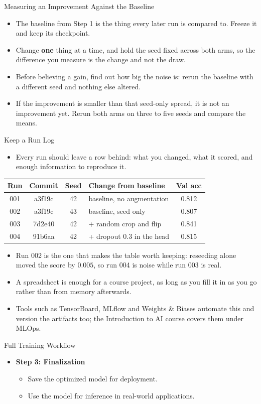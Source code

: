 \begin{frame}{Measuring an Improvement Against the Baseline}
\begin{itemize}
    \item The baseline from Step 1 is the thing every later run is compared to. Freeze it and keep its checkpoint.
    \item Change \textbf{one} thing at a time, and hold the seed fixed across both arms, so the difference you measure is the change and not the draw.
    \item Before believing a gain, find out how big the noise is: rerun the baseline with a different seed and nothing else altered.
    \item If the improvement is smaller than that seed-only spread, it is not an improvement yet. Rerun both arms on three to five seeds and compare the means.
\end{itemize}
\end{frame}

\begin{frame}{Keep a Run Log}
\begin{itemize}
    \item Every run should leave a row behind: what you changed, what it scored, and enough information to reproduce it.
\end{itemize}
\vspace{0.5em}
\begin{center}
\small
\begin{tabular}{|c|c|c|l|c|}
    \hline
    \textbf{Run} & \textbf{Commit} & \textbf{Seed} & \textbf{Change from baseline} & \textbf{Val acc} \\
    \hline
    001 & a3f19c & 42 & baseline, no augmentation & 0.812 \\
    002 & a3f19c & 43 & baseline, seed only & 0.807 \\
    003 & 7d2e40 & 42 & + random crop and flip & 0.841 \\
    004 & 91b6aa & 42 & + dropout 0.3 in the head & 0.815 \\
    \hline
\end{tabular}
\end{center}
\vspace{0.5em}
\begin{itemize}
    \item Run 002 is the one that makes the table worth keeping: reseeding alone moved the score by $0.005$, so run 004 is noise while run 003 is real.
    \item A spreadsheet is enough for a course project, as long as you fill it in as you go rather than from memory afterwards.
    \item Tools such as TensorBoard, MLflow and Weights \& Biases automate this and version the artifacts too; the Introduction to AI course covers them under MLOps.
\end{itemize}
\end{frame}

\begin{frame}{Full Training Workflow}
\begin{itemize}
    \item \textbf{Step 3: Finalization}
    \begin{itemize}
        \item Save the optimized model for deployment.
        \item Use the model for inference in real-world applications.
    \end{itemize}
\end{itemize}
\end{frame} 